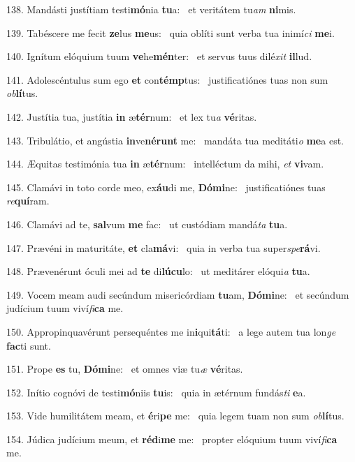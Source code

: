 138. Mandásti justítiam testi\textbf{mó}nia \textbf{tu}a: \ast\  et veritátem tu\textit{am} \textbf{ni}mis.\

139. Tabéscere me fecit \textbf{ze}lus \textbf{me}us: \ast\  quia oblíti sunt verba tua inimí\textit{ci} \textbf{me}i.\

140. Ignítum elóquium tuum \textbf{ve}he\textbf{mén}ter: \ast\  et servus tuus dilé\textit{xit} \textbf{il}lud.\

141. Adolescéntulus sum ego \textbf{et} con\textbf{témp}tus: \ast\  justificatiónes tuas non sum \textit{ob}\textbf{lí}tus.\

142. Justítia tua, justítia \textbf{in} æ\textbf{tér}num: \ast\  et lex tu\textit{a} \textbf{vé}ritas.\

143. Tribulátio, et angústia \textbf{in}ve\textbf{né}\textbf{runt} me: \ast\  mandáta tua meditáti\textit{o} \textbf{me}a est.\

144. Æquitas testimónia tua \textbf{in} æ\textbf{tér}num: \ast\  intelléctum da mihi, \textit{et} \textbf{vi}vam.\

145. Clamávi in toto corde meo, ex\textbf{áu}di me, \textbf{Dó}\textbf{mi}ne: \ast\  justificatiónes tuas \textit{re}\textbf{quí}ram.\

146. Clamávi ad te, \textbf{sal}vum \textbf{me} fac: \ast\  ut custódiam mandá\textit{ta} \textbf{tu}a.\

147. Prævéni in maturitáte, \textbf{et} cla\textbf{má}vi: \ast\  quia in verba tua super\textit{spe}\textbf{rá}vi.\

148. Prævenérunt óculi mei ad \textbf{te} di\textbf{lú}\textbf{cu}lo: \ast\  ut meditárer elóqui\textit{a} \textbf{tu}a.\

149. Vocem meam audi secúndum misericórdiam \textbf{tu}am, \textbf{Dó}\textbf{mi}ne: \ast\  et secúndum judícium tuum viví\textit{fi}\textbf{ca} me.\

150. Appropinquavérunt persequéntes me in\textbf{i}qui\textbf{tá}ti: \ast\  a lege autem tua lon\textit{ge} \textbf{fac}ti sunt.\

151. Prope \textbf{es} tu, \textbf{Dó}\textbf{mi}ne: \ast\  et omnes viæ tu\textit{æ} \textbf{vé}ritas.\

152. Inítio cognóvi de testi\textbf{mó}niis \textbf{tu}is: \ast\  quia in ætérnum fundás\textit{ti} \textbf{e}a.\

153. Vide humilitátem meam, et \textbf{é}ri\textbf{pe} me: \ast\  quia legem tuam non sum \textit{ob}\textbf{lí}tus.\

154. Júdica judícium meum, et \textbf{réd}i\textbf{me} me: \ast\  propter elóquium tuum viví\textit{fi}\textbf{ca} me.\


